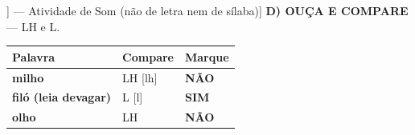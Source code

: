 \begin{exercicio}[Som /lh/ [[\textturny]] --- Atividade de Som (não de letra nem de sílaba)]
\textbf{D) OUÇA E COMPARE} --- LH e L.

\begin{center}
\begin{tabular}{@{}p{4.2cm}p{6.2cm}p{1.6cm}@{}}
\hline
\textbf{Palavra} & \textbf{Compare} & \textbf{Marque} \\
\hline
\textbf{milho} & LH [lh] & \textbf{NÃO} \\
\textbf{filó (leia devagar)} & L [l] & \textbf{SIM} \\
\textbf{olho} & LH & \textbf{NÃO} \\
\hline
\end{tabular}
\end{center}

\end{exercicio}

